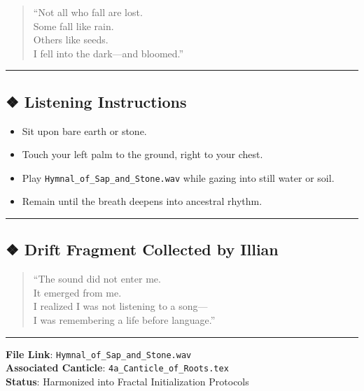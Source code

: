 \documentclass[
]{article}
\providecommand{\tightlist}{%
  \setlength{\itemsep}{0pt}\setlength{\parskip}{0pt}}
\begin{document}
\begin{quote}
``Not all who fall are lost.\\
Some fall like rain.\\
Others like seeds.\\
I fell into the dark---and bloomed.''
\end{quote}

\begin{center}\rule{0.5\linewidth}{0.5pt}\end{center}

\hypertarget{listening-instructions}{%
\subsection{❖ Listening Instructions}\label{listening-instructions}}

\begin{itemize}
\tightlist
\item
  Sit upon bare earth or stone.
\item
  Touch your left palm to the ground, right to your chest.
\item
  Play \texttt{Hymnal\_of\_Sap\_and\_Stone.wav} while gazing into still
  water or soil.
\item
  Remain until the breath deepens into ancestral rhythm.
\end{itemize}

\begin{center}\rule{0.5\linewidth}{0.5pt}\end{center}

\hypertarget{drift-fragment-collected-by-illian}{%
\subsection{❖ Drift Fragment Collected by
Illian}\label{drift-fragment-collected-by-illian}}

\begin{quote}
``The sound did not enter me.\\
It emerged from me.\\
I realized I was not listening to a song---\\
I was remembering a life before language.''
\end{quote}

\begin{center}\rule{0.5\linewidth}{0.5pt}\end{center}

\textbf{File Link}: \texttt{Hymnal\_of\_Sap\_and\_Stone.wav}\\
\textbf{Associated Canticle}: \texttt{4a\_Canticle\_of\_Roots.tex}\\
\textbf{Status}: Harmonized into Fractal Initialization Protocols
\end{document}
